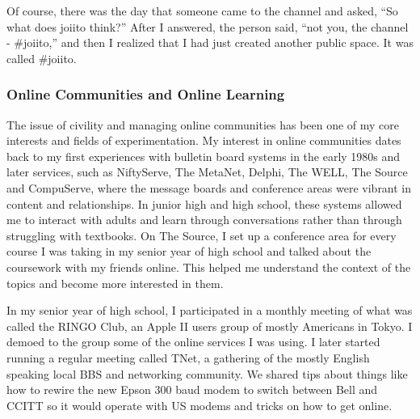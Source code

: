 Of course, there was the day that someone came to the channel and asked, ``So what does joiito think?'' After I answered, the person said, ``not you, the channel - \#joiito,'' and then I realized that I had just created another public space. It was called \#joiito.

\subsubsection{Online Communities and Online Learning}

The issue of civility and managing online communities has been one of my core interests and fields of experimentation. My interest in online communities dates back to my first experiences with bulletin board systems in the early 1980s and later services, such as NiftyServe, The MetaNet, Delphi, The WELL, The Source and CompuServe, where the message boards and conference areas were vibrant in content and relationships. In junior high and high school, these systems allowed me to interact with adults and learn through conversations rather than through struggling with textbooks. On The Source, I set up a conference area for every course I was taking in my senior year of high school and talked about the coursework with my friends online. This helped me understand the context of the topics and become more interested in them.

In my senior year of high school, I participated in a monthly meeting of what was called the RINGO Club, an Apple II users group of mostly Americans in Tokyo. I demoed to the group some of the online services I was using. I later started running a regular meeting called TNet, a gathering of the mostly English speaking local BBS and networking community. We shared tips about things like how to rewire the new Epson 300 baud modem to switch between Bell and CCITT so it would operate with US modems and tricks on how to get online. 

